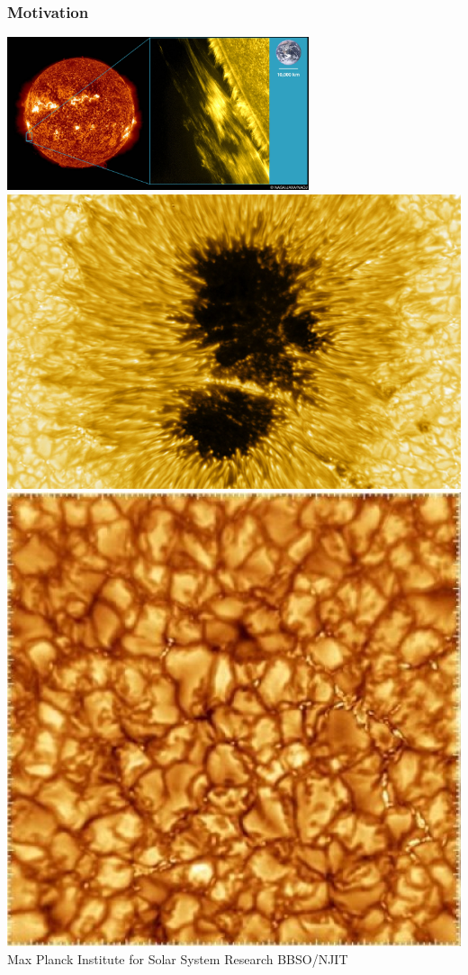\documentclass{beamer}
\begin{document}
\begin{frame}
\frametitle{Motivation}
\centering
\includegraphics[height=4.5cm]{media/hinode-prominence.jpg}
\\
\vspace*{0.05in}
\includegraphics[height=3.5 cm]{media/sunspot_lightbridge.png}
\hspace*{0.5in}
\includegraphics[height=3.5 cm]{media/granules.jpg}
\vspace*{-0.05in}
\flushright
\tiny{Max Planck Institute for Solar System Research \hspace*{3.6cm} BBSO/NJIT}
\end{frame}
\end{document}
